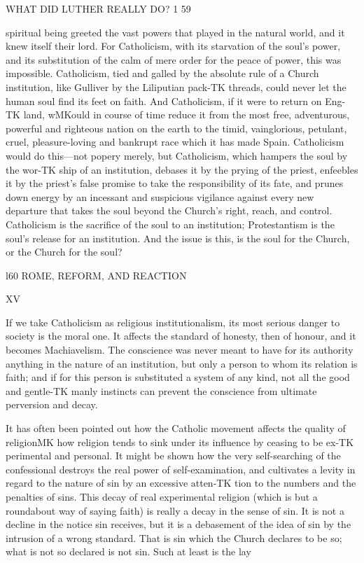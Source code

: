 \documentclass[12pt,a5paper,twoside]{book}
\begin{document}
{WHAT DID LUTHER REALLY DO? 1 59 

spiritual being greeted the vast powers that played in 
the natural world, and it knew itself their lord. For 
Catholicism, with its starvation of the soul's power, 
and its substitution of the calm of mere order for the 
peace of power, this was impossible. Catholicism, 
tied and galled by the absolute rule of a Church 
institution, like Gulliver by the Liliputian pack-TK
threads, could never let the human soul find its feet on 
faith. And Catholicism, if it were to return on Eng-TK
land, wMKould in course of time reduce it from the most 
free, adventurous, powerful and righteous nation on 
the earth to the timid, vainglorious, petulant, cruel, 
pleasure-loving and bankrupt race which it has made 
Spain. Catholicism would do this---not popery merely, 
but Catholicism, which hampers the soul by the wor-TK
ship of an institution, debases it by the prying of the 
priest, enfeebles it by the priest's false promise to take 
the responsibility of its fate, and prunes down energy 
by an incessant and suspicious vigilance against every 
new departure that takes the soul beyond the Church's 
right, reach, and control. Catholicism is the sacrifice 
of the soul to an institution; Protestantism is the 
soul's release for an institution. And the issue is 
this, is the soul for the Church, or the Church for the 
soul? 



l60 ROME, REFORM, AND REACTION 

XV 

If we take Catholicism as religious institutionalism, 
its most serious danger to society is the moral one. It 
affects the standard of honesty, then of honour, and it 
becomes Machiavelism. The conscience was never 
meant to have for its authority anything in the nature 
of an institution, but only a person to whom its 
relation is faith; and if for this person is substituted 
a system of any kind, not all the good and gentle-TK
manly instincts can prevent the conscience from 
ultimate perversion and decay. 

It has often been pointed out how the Catholic 
movement affects the quality of religionMK how religion 
tends to sink under its influence by ceasing to be ex-TK
perimental and personal. It might be shown how the 
very self-searching of the confessional destroys the 
real power of self-examination, and cultivates a levity 
in regard to the nature of sin by an excessive atten-TK
tion to the numbers and the penalties of sins. This 
decay of real experimental religion (which is but a 
roundabout way of saying faith) is really a decay in 
the sense of sin. It is not a decline in the notice 
sin receives, but it is a debasement of the idea of 
sin by the intrusion of a wrong standard. That is 
sin which the Church declares to be so; what is 
not so declared is not sin. Such at least is the lay 



}
\end{document}
